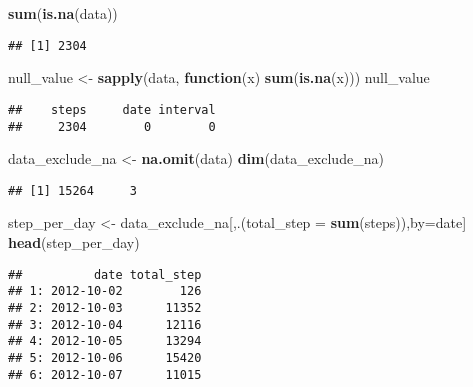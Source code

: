 \documentclass[
]{article}
\newenvironment{Shaded}{\begin{snugshade}}{\end{snugshade}}
\newcommand{\CommentTok}[1]{\textcolor[rgb]{0.56,0.35,0.01}{\textit{#1}}}
\newcommand{\ControlFlowTok}[1]{\textcolor[rgb]{0.13,0.29,0.53}{\textbf{#1}}}
\newcommand{\DataTypeTok}[1]{\textcolor[rgb]{0.13,0.29,0.53}{#1}}
\newcommand{\KeywordTok}[1]{\textcolor[rgb]{0.13,0.29,0.53}{\textbf{#1}}}
\newcommand{\NormalTok}[1]{#1}
\newcommand{\OperatorTok}[1]{\textcolor[rgb]{0.81,0.36,0.00}{\textbf{#1}}}
\newcommand{\StringTok}[1]{\textcolor[rgb]{0.31,0.60,0.02}{#1}}
\begin{document}
\begin{Shaded}
\begin{Highlighting}[]
\KeywordTok{sum}\NormalTok{(}\KeywordTok{is.na}\NormalTok{(data))}
\end{Highlighting}
\end{Shaded}

\begin{verbatim}
## [1] 2304
\end{verbatim}

\begin{Shaded}
\begin{Highlighting}[]
\NormalTok{null_value <-}\StringTok{ }\KeywordTok{sapply}\NormalTok{(data, }\ControlFlowTok{function}\NormalTok{(x) }\KeywordTok{sum}\NormalTok{(}\KeywordTok{is.na}\NormalTok{(x)))}
\NormalTok{null_value}
\end{Highlighting}
\end{Shaded}

\begin{verbatim}
##    steps     date interval 
##     2304        0        0
\end{verbatim}

\begin{Shaded}
\begin{Highlighting}[]
\NormalTok{data_exclude_na <-}\StringTok{ }\KeywordTok{na.omit}\NormalTok{(data)}
\KeywordTok{dim}\NormalTok{(data_exclude_na)}
\end{Highlighting}
\end{Shaded}

\begin{verbatim}
## [1] 15264     3
\end{verbatim}

\begin{Shaded}
\begin{Highlighting}[]
\NormalTok{step_per_day <-}\StringTok{ }\NormalTok{data_exclude_na[,.(}\DataTypeTok{total_step =} \KeywordTok{sum}\NormalTok{(steps)),by=date]}
\KeywordTok{head}\NormalTok{(step_per_day)}
\end{Highlighting}
\end{Shaded}

\begin{verbatim}
##          date total_step
## 1: 2012-10-02        126
## 2: 2012-10-03      11352
## 3: 2012-10-04      12116
## 4: 2012-10-05      13294
## 5: 2012-10-06      15420
## 6: 2012-10-07      11015
\end{verbatim}

\begin{Shaded}
\end{Shaded}
\end{document}
